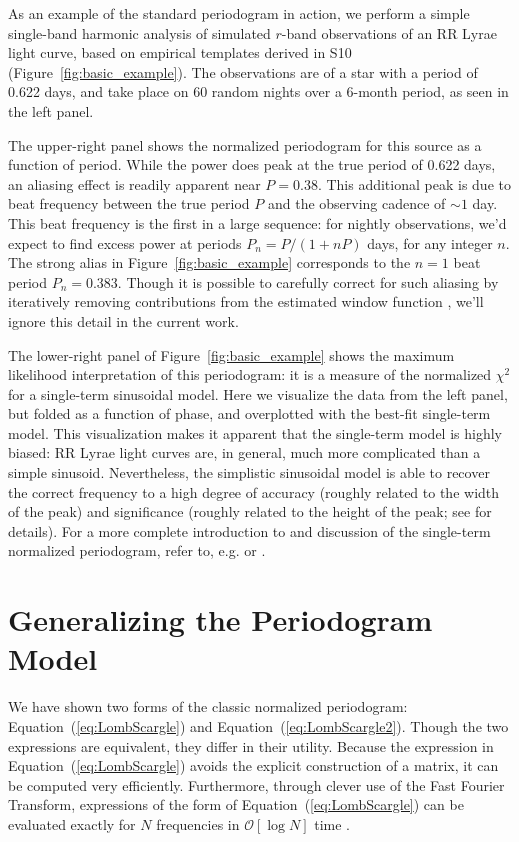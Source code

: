 \documentclass{emulateapj}
\newcommand{\Fig}[1]{Figure~\ref{fig:#1}}
\newcommand{\fig}[1]{\Fig{#1}}
\newcommand{\Eq}[1]{Equation~(\ref{eq:#1})}
\newcommand{\eq}[1]{\Eq{#1}}
\newcommand{\sectlabel}[1]{\label{sect:#1}}
\begin{document}
As an example of the standard periodogram in action, we perform a simple single-band harmonic analysis of simulated $r$-band observations of an RR Lyrae light curve, based on empirical templates derived in S10 (\fig{basic_example}). The observations are of a star with a period of 0.622 days, and take place on 60 random nights over a 6-month period, as seen in the left panel.

The upper-right panel shows the normalized periodogram for this source as a function of period. While the power does peak at the true period of 0.622 days, an aliasing effect is readily apparent near $P=0.38$. This additional peak is due to beat frequency between the true period $P$ and the observing cadence of $\sim 1$ day. This beat frequency is the first in a large sequence: for nightly observations, we'd expect to find excess power at periods $P_n = P / (1 + nP)$ days, for any integer $n$. The strong alias in \fig{basic_example} corresponds to the $n=1$ beat period $P_n=0.383$. Though it is possible to carefully correct for such aliasing by iteratively removing contributions from the estimated window function \citep[e.g.][]{Roberts87}, we'll ignore this detail in the current work.

The lower-right panel of \fig{basic_example} shows the maximum likelihood interpretation of this periodogram: it is a measure of the normalized $\chi^2$ for a single-term sinusoidal model. Here we visualize the data from the left panel, but folded as a function of phase, and overplotted with the best-fit single-term model. This visualization makes it apparent that the single-term model is highly biased: RR Lyrae light curves are, in general, much more complicated than a simple sinusoid. Nevertheless, the simplistic sinusoidal model is able to recover the correct frequency to a high degree of accuracy (roughly related to the width of the peak) and significance (roughly related to the height of the peak; see \citet{Scargle82} for details). For a more complete introduction to and discussion of the single-term normalized periodogram, refer to, e.g. \citet{Bretthorst88} or \citet{ICVG2014}.

\section{Generalizing the Periodogram Model}
\sectlabel{extending_periodogram}
We have shown two forms of the classic normalized periodogram: \eq{LombScargle} and \eq{LombScargle2}. Though the two expressions are equivalent, they differ in their utility. Because the expression in \eq{LombScargle} avoids the explicit construction of a matrix, it can be computed very efficiently. Furthermore, through clever use of the Fast Fourier Transform, expressions of the form of \eq{LombScargle} can be evaluated exactly for $N$ frequencies in $\mathcal{O}[\log{N}]$ time \citep{Press89}.
\end{document}
